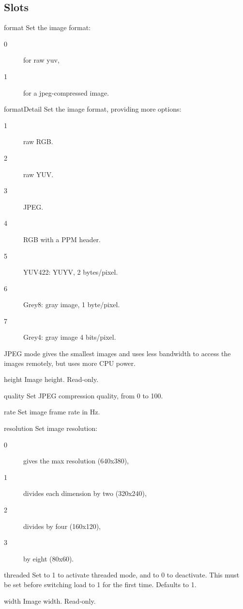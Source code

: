 \subsection{Slots}
\begin{urbiscriptapi}
\item[format] Set the image format:
  \begin{sublist}
    \begin{description}
    \item[0] for raw yuv,
    \item[1] for a jpeg-compressed image.
    \end{description}
  \end{sublist}


\item[formatDetail] Set the image format, providing more options:
  \begin{sublist}
    \begin{description}
    \item[1] raw RGB.
    \item[2] raw YUV.
    \item[3] JPEG.
    \item[4] RGB with a PPM header.
    \item[5] YUV422: YUYV, 2 bytes/pixel.
    \item[6] Grey8: gray image, 1 byte/pixel.
    \item[7] Grey4: gray image 4 bits/pixel.
    \end{description}
  \end{sublist}
  JPEG mode gives the smallest images and uses less bandwidth to access the
  images remotely, but uses more CPU power.


\item[height] Image height. Read-only.


\item[quality] Set JPEG compression quality, from 0 to 100.


\item[rate] Set image frame rate in Hz.


\item[resolution] Set image resolution:
  \begin{sublist}
    \begin{description}
    \item[0] gives the max resolution (640x380),
    \item[1] divides each dimension by two (320x240),
    \item[2] divides by four (160x120),
    \item[3] by eight (80x60).
    \end{description}
  \end{sublist}


\item[threaded] Set to 1 to activate threaded mode, and to 0 to
  deactivate. This must be set before switching load to 1 for the first
  time. Defaults to 1.


\item[width] Image width. Read-only.
\end{urbiscriptapi}


